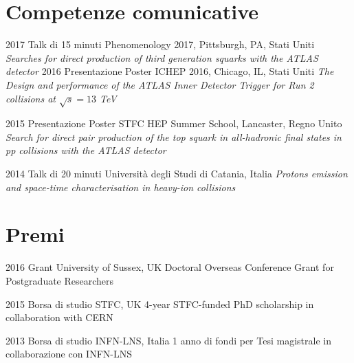 \documentclass[print]{cv} %
\begin{document}
\section{Competenze comunicative}

\begin{entrylist}

  \entry
    {2017}
    {Talk di 15 minuti}
    {Phenomenology 2017, Pittsburgh, PA, Stati Uniti}
    {\emph{Searches for direct production of third generation squarks with the ATLAS detector}}
  \entry
    {2016}
    {Presentazione Poster}
    {ICHEP 2016, Chicago, IL, Stati Uniti}
    {\emph{The Design and performance of the ATLAS Inner Detector Trigger for Run 2 collisions at $\sqrt{s} = 13$ TeV}}

  \entry
    {2015}
    {Presentazione Poster}
    {STFC HEP Summer School, Lancaster, Regno Unito}
    {\emph{Search for direct pair production of the top squark in all-hadronic final states in \emph{pp} collisions with the ATLAS detector}}

  \entry
    {2014}
    {Talk di 20 minuti }
    {Università degli Studi di Catania, Italia}
    {\emph{Protons emission and space-time characterisation in heavy-ion collisions}}
\end{entrylist}

\section{Premi}

\begin{entrylist}
  \entry
      {2016}
      {Grant}
      {University of Sussex, UK}
      {Doctoral Overseas Conference Grant for Postgraduate Researchers}

  \entry
      {2015}
      {Borsa di studio}
      {STFC, UK}
      {4-year STFC-funded PhD scholarship in collaboration with CERN}

  \entry
      {2013}
      {Borsa di studio}
      {INFN-LNS, Italia}
      {1 anno di fondi per Tesi magistrale in collaborazione con INFN-LNS}
\end{entrylist}
\end{document}
